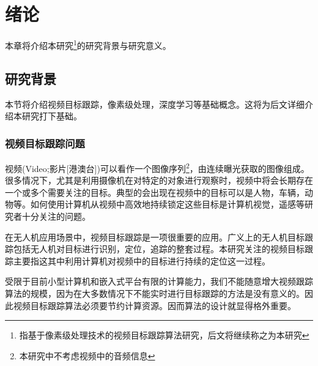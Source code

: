
\chapter{绪论}
本章将介绍本研究\footnote{指基于像素级处理技术的视频目标跟踪算法研究，后文将继续称之为本研究}的研究背景与研究意义。

\section{研究背景}
本节将介绍视频目标跟踪，像素级处理，深度学习等基础概念。这将为后文详细介绍本研究打下基础。

\subsection{视频目标跟踪问题}
视频(Video;影片[港澳台])可以看作一个图像序列\footnote{本研究中不考虑视频中的音频信息}，由连续曝光获取的图像组成。很多情况下，尤其是利用摄像机在对特定的对象进行观察时，视频中将会长期存在一个或多个需要关注的目标。典型的会出现在视频中的目标可以是人物，车辆，动物等。如何使用计算机从视频中高效地持续锁定这些目标是计算机视觉，遥感等研究者十分关注的问题。
\par
在无人机应用场景中，视频目标跟踪是一项很重要的应用。广义上的无人机目标跟踪包括无人机对目标进行识别，定位，追踪的整套过程。本研究关注的视频目标跟踪主要指这其中利用计算机对视频中的目标进行持续的定位这一过程。
\par
受限于目前小型计算机和嵌入式平台有限的计算能力，我们不能随意增大视频跟踪算法的规模，因为在大多数情况下不能实时进行目标跟踪的方法是没有意义的。因此视频目标跟踪算法必须要节约计算资源。因而算法的设计就显得格外重要。

